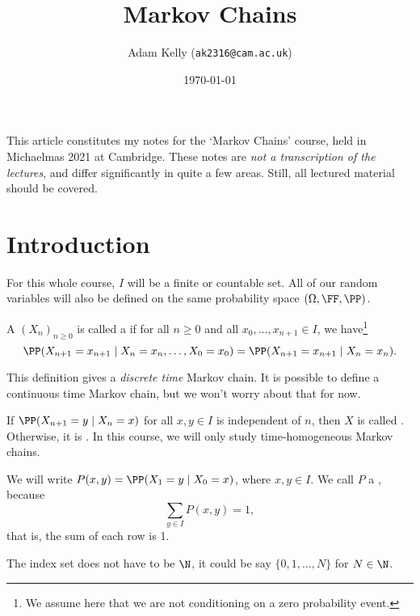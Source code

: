 \documentclass[a4paper]{scrartcl}
\title{Markov Chains}
\author{Adam Kelly (\texttt{ak2316@cam.ac.uk})}
\date{\today}
\begin{document}
\maketitle

This article constitutes my notes for the `Markov Chains' course, held in Michaelmas 2021 at Cambridge. These notes are \emph{not a transcription of the lectures}, and differ significantly in quite a few areas. Still, all lectured material should be covered.


\tableofcontents



\section{Introduction}

For this whole course, $I$ will be a finite or countable set. All of our random variables will also be defined on the same probability space $(\Omega, \FF, \PP)$.

\begin{definition}
	A  $(X_n)_{n \geq 0}$ is called a  if for all $n \geq 0$ and all $x_0, \dots, x_{n+1} \in I$, we have\footnote{We assume here that we are not conditioning on a zero probability event.}
	$$
	\PP(X_{n + 1} = x_{n + 1} \mid X_n = x_n, \dots, X_0 = x_0) = \PP(X_{n + 1} = x_{n + 1} \mid X_n = x_n).
	$$
\end{definition}

\begin{remark}
	This definition gives a \emph{discrete time} Markov chain. It is possible to define a continuous time Markov chain, but we won't worry about that for now.
\end{remark}

If $\PP(X_{n + 1} = y \mid X_n = x)$ for all $x, y \in I$ is independent of $n$, then $X$ is called . Otherwise, it is . In this course, we will only study time-homogeneous Markov chains.

We will write $P(x, y) = \PP(X_1 = y \mid X_0 = x)$, where $x, y \in I$. We call $P$ a , because
$$
	\sum_{y \in I} P(x, y) = 1,
$$
that is, the sum of each row is 1.


\begin{remark}
	The index set does not have to be $\N$, it could be say $\{0, 1, \dots, N\}$ for $N \in \N$.
\end{remark}
\end{document}
